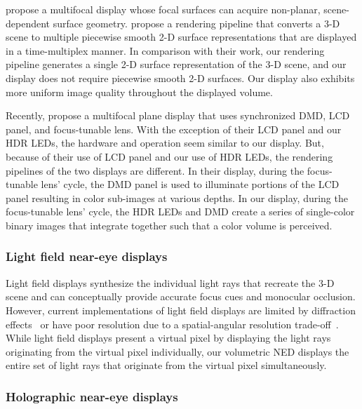 \citet{Matsuda2017focal} propose a multifocal display whose focal surfaces can acquire non-planar, scene-dependent surface geometry. \citet{Matsuda2017focal} propose a rendering pipeline that converts a 3-D scene to multiple piecewise smooth 2-D surface representations that are displayed in a time-multiplex manner. In comparison with their work, our rendering pipeline generates a single 2-D surface representation of the 3-D scene, and our display does not require piecewise smooth 2-D surfaces. Our display also exhibits more uniform image quality throughout the displayed volume. 

Recently, \citet{Lee2018Tomoreal,Lee2018Shape} propose a multifocal plane display that uses synchronized DMD, LCD panel, and focus-tunable lens. With the exception of their LCD panel and our HDR LEDs, the hardware and operation seem similar to our display. But, because of their use of LCD panel and our use of HDR LEDs, the rendering pipelines of the two displays are different. In their display, during the focus-tunable lens' cycle, the DMD panel is used to illuminate portions of the LCD panel resulting in color sub-images at various depths. In our display, during the focus-tunable lens' cycle, the HDR LEDs and DMD create a series of single-color binary images that integrate together such that a color volume is perceived. 


\subsubsection{Light field near-eye displays}
\label{sec:volumetric:light_field_displays}
Light field displays synthesize the individual light rays that recreate the 3-D scene and can conceptually provide accurate focus cues and monocular occlusion. However, current implementations of light field displays are limited by diffraction effects~\cite{Maimone2014Pinlight,Huang2015Light} or have poor resolution due to a spatial-angular resolution trade-off~\cite{Lanman2013near,Hua2014Three}. While light field displays present a virtual pixel by displaying the light rays originating from the virtual pixel individually, our volumetric NED displays the entire set of light rays that originate from the virtual pixel simultaneously.

\subsubsection{Holographic near-eye displays}
\label{sec:volumetric:holographic_displays}

